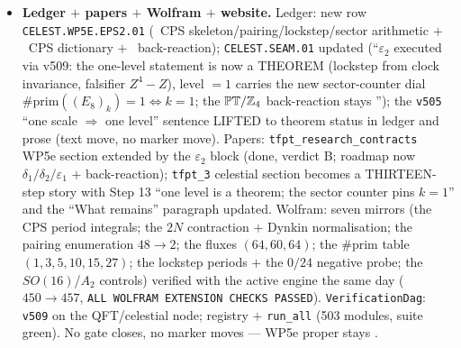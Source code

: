 \begin{itemize}[leftmargin=1.5em]
the monodromy is the pure phase $i$ and $\det(A{-}1)=-4\neq0$ (no invariant flux vector) ---
$k_1=k_2=k_3$ IS A THEOREM of clock invariance; NEGATIVE PROBE (new falsifier): the
clock-forbidden family $Z^4{-}Z$ (smooth, disc $-27$, branch points $\{0,1,\omega,\omega^2\}$
not a $\mu_4$ orbit): over ALL $24$ orderings ZERO chains with three equal period moduli ($1$ vs
$\sqrt3$); HONEST LIMIT: uniform flux doubling keeps the lockstep --- the theorem proves
EQUALITY, not the value ($1$ from the counters and the CPS minimal quantum $N=1$).
\emph{Negative controls}: $k=2$ (current count $0$, residual $360$, prefactor $-31/48$,
$\#$prim $3$ --- while the lockstep dial honestly does NOT fire); $SO(16)$ (fluxes $(0,60,0)$:
spheres $1/3$ FLUX-DARK, defect $-30\neq-78$, condensation stuck at $4=\det\mathrm{Cartan}(D_8)$);
$A_2$ (det $3\neq4$, glue diagonal $23/24\notin\Z$, $\mu=12$ no perfect square: NO Lagrangian
subgroup, Coxeter $3\neq4$). Typed honestly: the CPS dictionary itself on $\mathbb{PT}/\Z_4$
stays \mC\ (their geometry is the $\mathbb C^2$ blow-up with one $(-1)$-sphere and
$\mathfrak{so}(8)$ at negative level --- not the $A_3$ ALE); the type-I B-model back-reaction
stays \mO\ (the same fence as \texttt{v502}/\texttt{v505}).
\item \textbf{Ledger $+$ papers $+$ Wolfram $+$ website.} Ledger: new row
\texttt{CELEST.WP5E.EPS2.01} (\mE\ CPS skeleton/pairing/lockstep/sector arithmetic $+$ \mC\ CPS
dictionary $+$ \mO\ back-reaction); \texttt{CELEST.SEAM.01} updated (``$\varepsilon_2$ executed
via v509: the one-level statement is now a THEOREM (lockstep from clock invariance, falsifier
$Z^4{-}Z$), level $=1$ carries the new sector-counter dial $\#\mathrm{prim}((E_8)_k)=1
\Leftrightarrow k=1$; the $\mathbb{PT}/\Z_4$ back-reaction stays \mO''); the \texttt{v505} ``one
scale $\Rightarrow$ one level'' sentence LIFTED to theorem status in ledger and prose (text move,
no marker move). Papers: \texttt{tfpt\_research\_contracts} WP5e section extended by the
$\varepsilon_2$ block (done, verdict B; roadmap now $\delta_1/\delta_2/\varepsilon_1$ $+$
back-reaction); \texttt{tfpt\_3} celestial section becomes a THIRTEEN-step story with Step 13
``one level is a theorem; the sector counter pins $k=1$'' and the ``What remains'' paragraph
updated. Wolfram: seven mirrors (the CPS period integrals; the $2N$ contraction $+$ Dynkin
normalisation; the pairing enumeration $48\to2$; the fluxes $(64,60,64)$; the $\#$prim table
$(1,3,5,10,15,27)$; the lockstep periods $+$ the $0/24$ negative probe; the $SO(16)$/$A_2$
controls) verified with the active engine the same day ($450\to457$, \texttt{ALL WOLFRAM
EXTENSION CHECKS PASSED}). \texttt{VerificationDag}: \texttt{v509} on the QFT/celestial node;
registry $+$ \texttt{run\_all} (503 modules, suite green). No gate closes, no marker moves ---
WP5e proper stays \mO.
\end{itemize}


